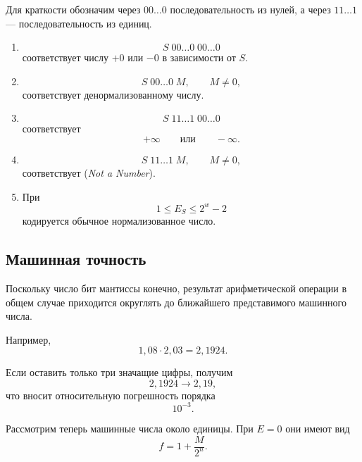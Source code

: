 \documentclass[../final.tex]{subfiles}
\begin{document}
Для краткости обозначим через $00\ldots0$ последовательность из нулей,
а через $11\ldots1$ --- последовательность из единиц.

\begin{enumerate}
    \item
    \[
        \boxed{S}\;
        \boxed{00\ldots0}\;
        \boxed{00\ldots0}
    \]
    соответствует числу $+0$ или $-0$ в зависимости от $S$.

    \item
    \[
        \boxed{S}\;
        \boxed{00\ldots0}\;
        \boxed{M},
        \qquad
        M\neq0,
    \]
    соответствует денормализованному числу.

    \item
    \[
        \boxed{S}\;
        \boxed{11\ldots1}\;
        \boxed{00\ldots0}
    \]
    соответствует
    \[
        +\infty
        \qquad\text{или}\qquad
        -\infty.
    \]

    \item
    \[
        \boxed{S}\;
        \boxed{11\ldots1}\;
        \boxed{M},
        \qquad
        M\neq0,
    \]
    соответствует  (\textit{Not a Number}).

    \item При
    \[
        1\leq E_S\leq2^w-2
    \]
    кодируется обычное нормализованное число.
\end{enumerate}


\subsection{Машинная точность}

Поскольку число бит мантиссы конечно, результат арифметической
операции в общем случае приходится округлять до ближайшего
представимого машинного числа.

Например,
%
\[
    1{,}08\cdot2{,}03
    =
    2{,}1924.
\]

Если оставить только три значащие цифры, получим
%
\[
    2{,}1924
    \longrightarrow
    2{,}19,
\]
%
что вносит относительную погрешность порядка
%
\[
    10^{-3}.
\]

Рассмотрим теперь машинные числа около единицы.
При $E=0$ они имеют вид
%
\begin{equation*}
    f
    =
    1+\frac{M}{2^n}.
\end{equation*}
\end{document}
